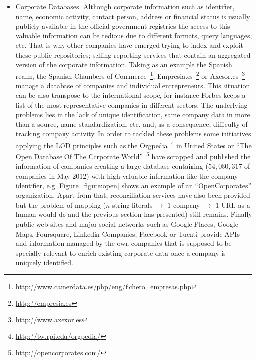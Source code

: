 \documentclass{llncs}
\begin{document}
\begin{itemize}
 
 \item Corporate Databases. Although corporate information such as identifier, name, economic activity, contact person, address or 
 financial status is usually publicly available in the official government registries the access to this valuable information can be 
 tedious due to different formats, query languages, etc. That is why other companies have emerged trying to index and exploit 
 these public repositories; selling reporting services that contain an aggregated version of the corporate information. Taking as 
 an example the Spanish realm, the Spanish Chambers of Commerce~\footnote{\url{http://www.camerdata.es/php/eng/fichero\_empresas.php}},
 Empresia.es~\footnote{\url{http://empresia.es}} or Axesor.es~\footnote{\url{http://www.axexor.es}} manage a database of companies and individual 
 entrepreneurs. This situation can be also transpose to the international scope, for instance Forbes keeps a list of 
 the most representative companies in different sectors. The underlying problems lies in the lack of unique identification, same company data in more 
 than a source, name standardization, etc. and, as a consequence, difficulty of tracking company activity. In order to tackled these problems some 
 initiatives applying the LOD principles such as the Orgpedia~\footnote{\url{http://tw.rpi.edu/orgpedia/}} in United States or 
 ``The Open Database Of The Corporate World''~\footnote{\url{http://opencorporates.com/}} have scrapped and published the information 
 of companies creating a large database containing ($54,080,317$ of companies in May 2012) with high-valuable information like the company 
 identifier, e.g. Figure~\ref{figure:open} shows an example of an ``OpenCorporates'' organization. Apart from that, reconciliation services have also been provided but the problem of mapping ($n$ string literals $\to$ $1$ company $\to$ $1$ URI, 
 as a human would do and the previous section has presented) still remains. Finally public web sites and major social networks such as Google 
 Places, Google Maps, Foursquare, Linkedin Companies, Facebook or Tuenti provide APIs and information managed by the own companies that is supposed 
 to be specially relevant to enrich existing corporate data once a company is uniquely identified.
 

\end{itemize}
\end{document}
